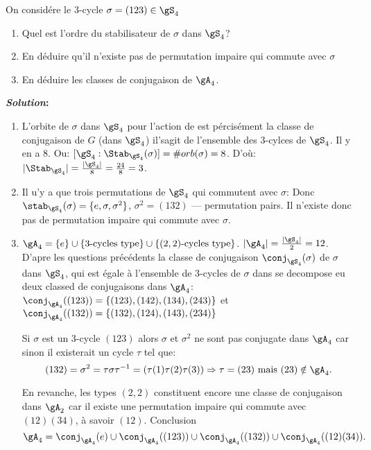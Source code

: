 \begin{exercise}

	On considére le 3-cycle $\sigma=(123)\in\gS_4$
	\begin{enumerate}
		\item Quel est l'ordre du stabilisateur de $\sigma$ dans $\gS_4$?
		\item En déduire qu'il n'existe pas de permutation impaire qui commute avec $\sigma$
		\item En déduire les classes de conjugaison de $\gA_4$.
	\end{enumerate}

	\textbf{\emph{Solution}:}

	\begin{enumerate}

		\item L'orbite de $\sigma$ dans $\gS_4$ pour l'action de est pércisément la classe de conjugaison de $G$ (dans $\gS_4$) il'sagit de l'ensemble des 3-cylces de $\gS_4$. Il y en a 8. Ou: $[\gS_4: \Stab_{\gS_4}(\sigma)]=\#orb(\sigma)=8$. D'où: $|\Stab_{\gS_4}|=\frac{|\gS_4|}{8}=\frac{24}{8}=3$.

		\item Il u'y a que trois permutations de $\gS_4$ qui commutent avec $\sigma$: Donc $\stab_{\gS_4}(\sigma)=\{e,\sigma,\sigma^2\}$, $\sigma^2=(132)$ --- permutation pairs. Il n'existe donc pas de permutation impaire qui commute avec $\sigma$.

		\item $\gA_4=\{e\}\cup\{3\text{-cycles type}\}\cup\{(2,2)\text{-cycles type}\}$. $|\gA_4|=\frac{|\gS_4|}2=12$.
		D'apre les questions précédents la classe de conjugaison $\conj_{\gS_4}(\sigma)$ de $\sigma$ dans $\gS_4$, qui est égale à l'ensemble de 3-cycles de $\sigma$ dans se decompose eu deux classed de conjugaisons dans $\gA_4$:\\ $\conj_{\gA_4}((123))=\{(123), (142), (134), (243)\}$ et\\$\conj_{\gA_4}((132))=\{(132), (124), (143), (234)\}$


		\begin{remark}
			Si $\sigma$ est un 3-cycle $(123)$ alors $\sigma$ et $\sigma^2$ ne sont pas conjugate dans $\gA_4$ car sinon il existerait un cycle $\tau$ tel que:
			$$(132)=\sigma^2=\tau\sigma\tau^{-1}=(\tau(1)\tau(2)\tau(3)) \Rightarrow \tau=(23) \mbox{ mais } (23)\notin \gA_4.$$
		\end{remark}


		En revanche, les types $(2,2)$ constituent encore une classe de conjugaison dans $\gA_2$ car il existe une permutation impaire qui commute avec $(12)(34)$, à savoir $(12)$. Conclusion $$\gA_4=\conj_{\gA_4}(e)\cup \conj_{\gA_4}((123))\cup \conj_{\gA_4}((132))\cup \conj_{\gA_4}((12)(34)).$$


\end{enumerate}
\end{exercise}

